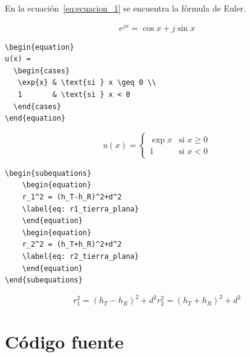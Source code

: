 En la ecuación~\eqref{eq:ecuacion_1} se encuentra la fórmula de Euler.

\begin{equation}
\label{eq:ecuacion_1}
 e^{jx} = \cos{x} + j \sin{x}
\end{equation}

\footnotesize
\begin{lstlisting}
\begin{equation}
u(x) = 
  \begin{cases} 
   \exp{x} & \text{si } x \geq 0 \\
   1       & \text{si } x < 0
  \end{cases}
\end{equation}
\end{lstlisting}
\normalsize

\begin{equation}
u(x) = 
  \begin{cases} 
   \exp{x} & \text{si } x \geq 0 \\
   1       & \text{si } x < 0
  \end{cases}
\end{equation}

\footnotesize
\begin{lstlisting}
\begin{subequations}
    \begin{equation}
    r_1^2 = (h_T-h_R)^2+d^2
    \label{eq: r1_tierra_plana}
    \end{equation}
    \begin{equation}
    r_2^2 = (h_T+h_R)^2+d^2
    \label{eq: r2_tierra_plana}
    \end{equation}
\end{subequations}
\end{lstlisting}
\normalsize

\begin{subequations}
    \begin{equation}
    r_1^2 = (h_T-h_R)^2+d^2
    \label{eq: r1_tierra_plana}
    \end{equation}
    \begin{equation}
    r_2^2 = (h_T+h_R)^2+d^2
    \label{eq: r2_tierra_plana}
    \end{equation}
\end{subequations}


\clearpage
\section{Código fuente}

